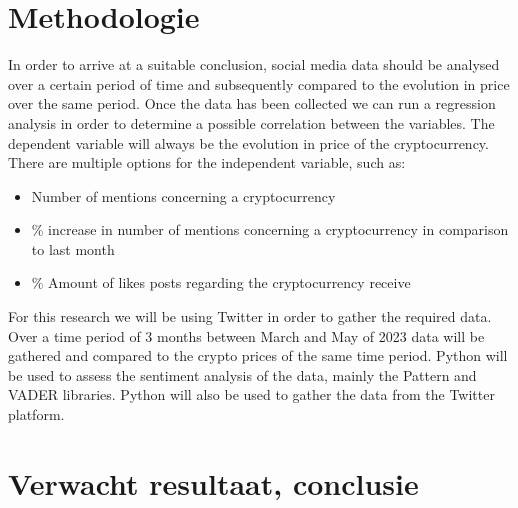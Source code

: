 


\section{Methodologie}%
\label{sec:methodologie}


\noindent In order to arrive at a suitable conclusion, social media data should be analysed over a certain period of time and subsequently compared to the evolution in price over the same period. Once the data has been collected we can run a regression analysis in order to determine a possible correlation between the variables. The dependent variable will always be the evolution in price of the cryptocurrency. There are multiple options for the independent variable, such as:

\begin{itemize}
    \item Number of mentions concerning a cryptocurrency
    
    \item \% increase in number of mentions concerning a cryptocurrency in comparison to last month
    \item \% Amount of likes posts regarding the cryptocurrency receive 
\end{itemize}

\noindent For this research we will be using Twitter in order to gather the required data. Over a time period of 3 months between March and May of 2023 data will be gathered and compared to the crypto prices of the same time period. Python will be used to assess the sentiment analysis of the data, mainly the Pattern and VADER libraries. Python will also  be used to gather the data from the Twitter platform.


\section{Verwacht resultaat, conclusie}%
\label{sec:verwachte_resultaten}

